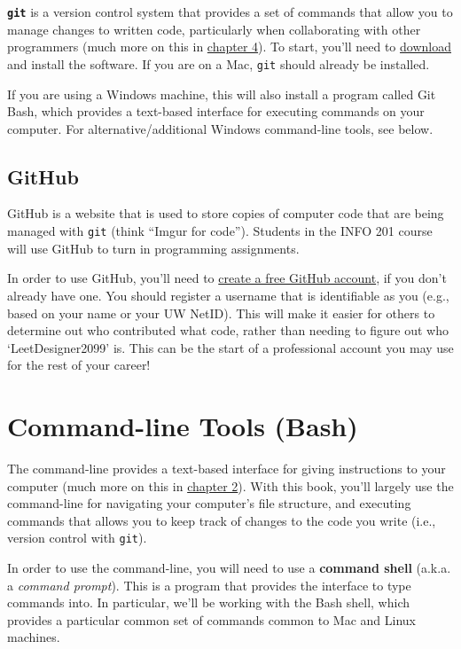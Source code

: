\documentclass[]{book}
\theoremstyle{definition}
\theoremstyle{definition}
\theoremstyle{remark}
\begin{document}
\textbf{\texttt{git}} is a version control system that provides a set of
commands that allow you to manage changes to written code, particularly
when collaborating with other programmers (much more on this in
\protect\hyperlink{git-basics}{chapter 4}). To start, you'll need to
\href{https://git-scm.com/downloads}{download} and install the software.
If you are on a Mac, \texttt{git} should already be installed.

If you are using a Windows machine, this will also install a program
called Git Bash, which provides a text-based interface for executing
commands on your computer. For alternative/additional Windows
command-line tools, see below.

\subsection{GitHub}\label{github}

GitHub is a website that is used to store copies of computer code that
are being managed with \texttt{git} (think ``Imgur for code''). Students
in the INFO 201 course will use GitHub to turn in programming
assignments.

In order to use GitHub, you'll need to
\href{https://github.com/join}{create a free GitHub account}, if you
don't already have one. You should register a username that is
identifiable as you (e.g., based on your name or your UW NetID). This
will make it easier for others to determine out who contributed what
code, rather than needing to figure out who `LeetDesigner2099' is. This
can be the start of a professional account you may use for the rest of
your career!

\section{Command-line Tools (Bash)}\label{command-line-tools-bash}

The command-line provides a text-based interface for giving instructions
to your computer (much more on this in
\protect\hyperlink{command-line}{chapter 2}). With this book, you'll
largely use the command-line for navigating your computer's file
structure, and executing commands that allows you to keep track of
changes to the code you write (i.e., version control with \texttt{git}).

In order to use the command-line, you will need to use a \textbf{command
shell} (a.k.a. a \emph{command prompt}). This is a program that provides
the interface to type commands into. In particular, we'll be working
with the Bash shell, which provides a particular common set of commands
common to Mac and Linux machines.
\end{document}
